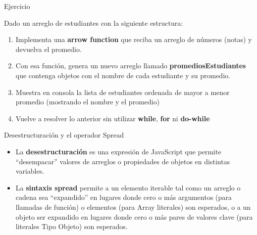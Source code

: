 \documentclass[aspectratio=43,10pt,t]{beamer}
\begin{document}
\begin{frame}{Ejercicio}\relax
\begingroup
{}
{\fontsize{11.2}{13.9}\selectfont Dado un arreglo de estudiantes con la siguiente estructura:\par}
{\fontsize{13.5}{16.7}\selectfont\mbox{}\par}
{\fontsize{13.5}{16.7}\selectfont\mbox{}\par}
{\fontsize{13.5}{16.7}\selectfont\mbox{}\par}
{\fontsize{13.5}{16.7}\selectfont\mbox{}\par}
{\fontsize{13.5}{16.7}\selectfont\mbox{}\par}
\begin{enumerate}
  \item Implementa una \textbf{arrow function} que reciba un arreglo de números (notas) y devuelva el promedio.
  \item Con esa función, genera un nuevo arreglo llamado \textbf{promediosEstudiantes} que contenga objetos con el nombre de cada estudiante y su promedio.
  \item Muestra en consola la lista de estudiantes ordenada de mayor a menor promedio (mostrando el nombre y el promedio)
  \item Vuelve a resolver lo anterior sin utilizar \textbf{while}, \textbf{for} ni \textbf{do-while}
\end{enumerate}
\endgroup
{}
\end{frame}

\begin{utnfondo}
\end{utnfondo}

\begin{frame}{Desestructuración y el operador Spread}\relax
\begingroup
{}
\begin{itemize}
  \item La \textbf{desestructuración} es una expresión de JavaScript que permite “desempacar” valores de arreglos o propiedades de objetos en distintas variables.
  \item La \textbf{sintaxis spread} permite a un elemento iterable tal como un arreglo o cadena sea “expandido” en lugares donde cero o más argumentos (para llamadas de función) o elementos (para Array literales) son esperados, o a un objeto ser expandido en lugares donde cero o más pares de valores clave (para literales Tipo Objeto) son esperados.
\end{itemize}
\endgroup
\end{frame}
\end{document}
